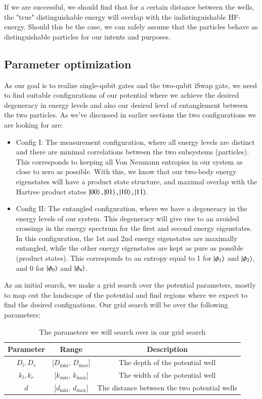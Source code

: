 \documentclass{subfiles}
\begin{document}
If we are successful, we should find that for a certain distance between the wells, the "true" distinguishable energy will overlap with the indistinguishable HF-energy. Should this be the case, we can safely assume that the particles behave as distinguishable particles for our intents and purposes. 

\subsection{Parameter optimization}\label{sec:optimization_procedure}
As our goal is to realize single-qubit gates and the two-qubit iSwap gate, we need to find suitable configurations of our potential where we achieve the desired degeneracy in energy levels and also our desired level of entanglement between the two particles. As we've discussed in earlier sections the two configurations we are looking for are:
\begin{itemize}
    \item Config I: The measurement configuration, where all energy levels are distinct and there are minimal correlations between the two subsystems (particles). This corresponds to keeping all Von Neumann entropies in our system as close to zero as possible. With this, we know that our two-body energy eigenstates will have a product state structure, and maximal overlap with the Hartree product states $\ket{00}, \ket{01}, \ket{10}, \ket{11}$.
    \item Config II: The entangled configuration, where we have a degeneracy in the energy levels of our system. This degeneracy will give rise to an avoided crossings in the energy spectrum for the first and second energy eigenstates. In this configuration, the 1st and 2nd energy eigenstates are maximally entangled, while the other energy eigenstates are kept as pure as possible (product states). This corresponds to an entropy equal to 1 for $\ket{\phi_1}$ and $\ket{\phi_2}$, and 0 for $\ket{\phi_0}$ and $\ket{\phi_4}$. 
\end{itemize}
As an initial search, we make a grid search over the potential parameters, mostly to map out the landscape of the potential and find regions where we expect to find the desired configuations. Our grid search will be over the following parameters:
\begin{table}
    \centering
    \begin{tabular}{|c|c|c|}
        \hline
        Parameter & Range & Description \\
        \hline
        $D_l, D_r$ & [$D_{\text{min}}$, $D_{\text{max}}$] & The depth of the potential well \\
        $k_l, k_r$ & [$k_{\text{min}}$, $k_{\text{max}}$] & The width of the potential well \\
        $d$ & [$d_{\text{min}}$, $d_{\text{max}}$] & The distance between the two potential wells \\
        \hline
    \end{tabular}
    \caption{The parameters we will search over in our grid search}
\end{table}
\end{document}

